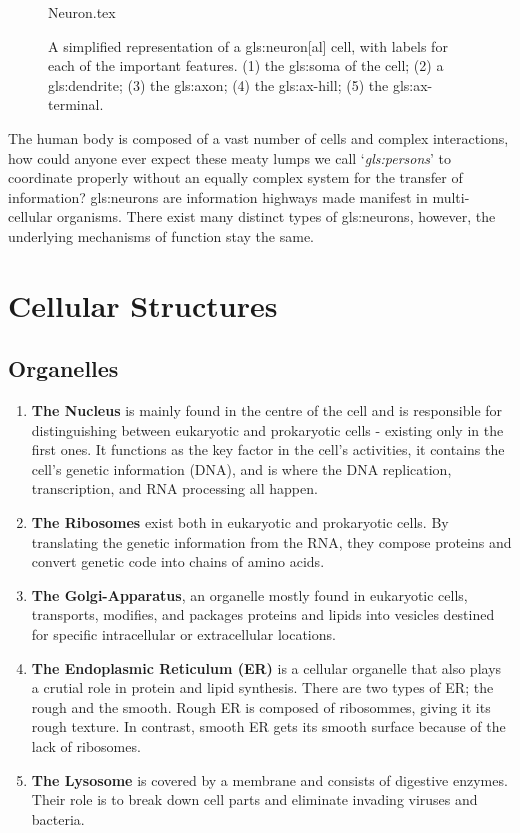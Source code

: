 \documentclass[class={myRUCProject}, crop=false]{standalone}
\begin{document}
\begin{figure}[H]
  \centering
  {Neuron.tex}
  \caption{A simplified representation of a \gls{gls:neuron}[al] cell, with labels for each of the important features. (1) the \gls{gls:soma} of the cell; (2) a \gls{gls:dendrite}; (3) the \gls{gls:axon}; (4) the \gls{gls:ax-hill}; (5) the \gls{gls:ax-terminal}.}\label{fig:Neuron}
\end{figure}

The human body is composed of a vast number of cells and complex interactions, how could anyone ever expect these meaty lumps we call `\textit{\glspl{gls:person}}' to coordinate properly without an equally complex system for the transfer of information? 
\Glspl{gls:neuron} are information highways made manifest in multi-cellular organisms. 
There exist many distinct types of \glspl{gls:neuron}, however, the underlying mechanisms of function stay the same.

\section{Cellular Structures}
\subsection{Organelles}
\begin{enumerate}

  \item \textbf{The Nucleus} is mainly found in the centre of the cell and is responsible for distinguishing between eukaryotic and prokaryotic cells - existing only in the first ones. It functions as the key factor in the cell's activities, it contains the cell's genetic information (DNA), and is where the DNA replication, transcription, and RNA processing all happen.
  \item \textbf{The Ribosomes} exist both in eukaryotic and prokaryotic cells. By translating the genetic information from the RNA, they compose proteins and convert genetic code into chains of amino acids.
  \item \textbf{The Golgi-Apparatus}, an organelle mostly found in eukaryotic cells, transports, modifies, and packages proteins and lipids into vesicles destined for specific intracellular or extracellular locations.
  \item \textbf{The Endoplasmic Reticulum (ER)} is a cellular organelle that also plays a crutial role in protein and lipid synthesis. There are two types of ER; the rough and the smooth. Rough ER is composed of ribosommes, giving it its rough texture. In contrast, smooth ER gets its smooth surface because of the lack of ribosomes.
  \item \textbf{The Lysosome} is covered by a membrane and consists of digestive enzymes. Their role is to break down cell parts and eliminate invading viruses and bacteria.
  
\end{enumerate}
\end{document}
